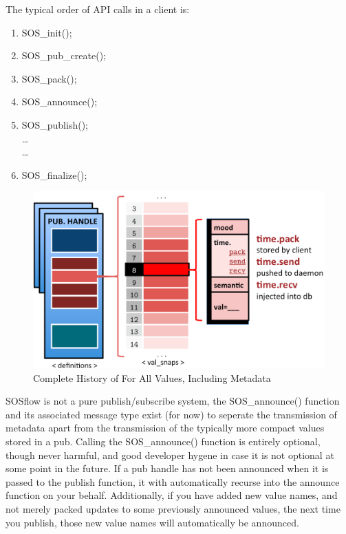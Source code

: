 The typical order of API calls in a client is:
%
\begin{enumerate}
    \item SOS\_init();
    \item SOS\_pub\_create();
    \item SOS\_pack();
    \item SOS\_announce();
    \item SOS\_publish();\\
    \dots\\
    \dots\\
    \item SOS\_finalize();
\end{enumerate}


\begin{figure}[!t]
\centering
\includegraphics[width=5in]{images/val_snaps.png}
\caption{Complete History of For All Values, Including Metadata}
\label{fig_sim}
\end{figure}

SOSflow is not a pure publish/subscribe system, the SOS\_announce()
function and its associated message type exist (for now) to seperate the
transmission of metadata apart from the transmission of the typically
more compact values stored in a pub.
%
Calling the SOS\_announce() function is entirely optional, though
never harmful, and good developer hygene in case it is not optional at
some point in the future.
%
If a pub handle has not been announced when it is passed to the
publish function, it with automatically recurse into the announce
function on your behalf.
%
Additionally, if you have added new value names, and not merely packed
updates to some previously announced values, the next time you
publish, those new value names will automatically be announced.

